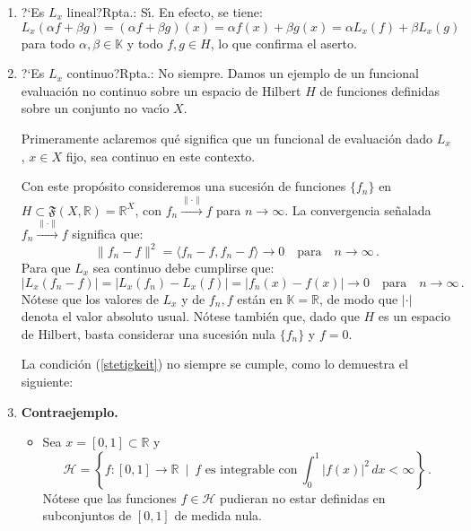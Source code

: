 \documentclass[12pt,reqno]{amsart}
\begin{document}
\begin{enumerate}
\item ?`Es $L_x$ lineal?\quad Rpta.: S\'\i. 
En efecto, se tiene:
\begin{equation*}
L_x(\alpha f + \beta g)
= (\alpha f + \beta g)(x)
= \alpha f(x) + \beta g(x)
= \alpha L_x(f) + \beta L_x(g)
\end{equation*}
para todo $\alpha,\beta\in\mathbb{K}$ y todo $f,g\in H$,
lo que confirma el aserto.

\item ?`Es $L_x$ continuo?\quad Rpta.: No siempre. 
Damos un ejemplo de un funcional evaluaci\'on no continuo sobre un espacio
de Hilbert $H$ de funciones definidas sobre un conjunto no vac\'\i o $X$.

\smallskip\noindent
Primeramente aclaremos qu\'e significa que un funcional de evaluaci\'on
dado $L_x$, $x\in X$ fijo, sea continuo en este contexto.

\smallskip\noindent
Con este prop\'osito consideremos una sucesi\'on de funciones
$\{f_n\}$ en  $H\subset\mathfrak{F}(X,\mathbb{R})=\mathbb{R}^X$,
con $f_n \overset{\|\cdot\|}{\rightarrow}f$ para
$n\rightarrow\infty$.
La convergencia se\~nalada $f_n \overset{\|\cdot\|}{\rightarrow}f$
significa que:
\begin{equation*}
\|f_n-f\|^2 = \langle f_n-f, f_n -f \rangle \rightarrow 0
\quad\text{para}\quad n\rightarrow\infty\,.
\end{equation*}
Para que $L_x$ sea continuo debe cumplirse que:
\begin{equation}\label{stetigkeit}
|L_x(f_n-f)| = |L_x(f_n)-L_x(f)| = |f_n(x) -f(x)| \rightarrow 0 
\quad\text{para}\quad n\rightarrow\infty\,.
\end{equation}
N\'otese que los valores de $L_x$ y de $f_n,f$ est\'an en
$\mathbb{K}=\mathbb{R}$, de modo que $|\cdot|$ denota el valor absoluto
usual.
N\'otese tambi\'en que, dado que $H$ es un espacio de Hilbert,
basta considerar una sucesi\'on nula $\{f_n\}$ y $f=0$.

\smallskip\noindent
La condici\'on (\ref{stetigkeit}) no siempre se cumple, como lo
demuestra el siguiente:

\smallskip\noindent
\item
\textbf{Contraejemplo.}\quad
\begin{itemize}
\item
Sea $x =[0,1]\subset\mathbb{R}$ y 
$$
\mathcal{H} = \left\{ f:[0,1]\rightarrow\mathbb{R} \ \mid\ 
\text{$f$ es integrable con}\ \int_0^1|f(x)|^2\,dx<\infty\right\}\,.
$$
N\'otese que las funciones $f\in\mathcal{H}$ pudieran no estar definidas
en subconjuntos de $[0,1]$ de medida nula.


\end{itemize}
\end{enumerate}
\end{document}
